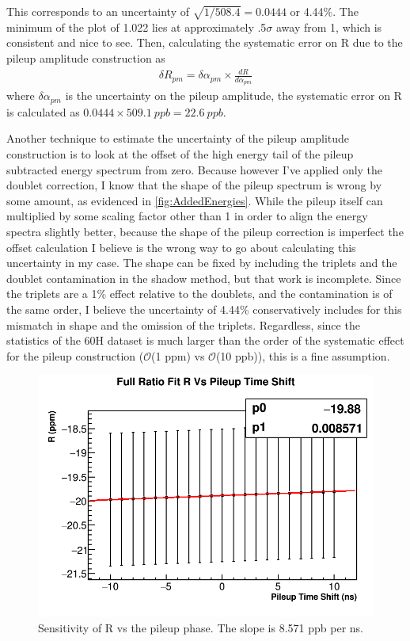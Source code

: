 	This corresponds to an uncertainty of $\sqrt{1/508.4} = 0.0444$ or 4.44\%. The minimum of the \chisq plot of 1.022 lies at approximately .5$\sigma$ away from 1, which is consistent and nice to see. Then, calculating the systematic error on R due to the pileup amplitude construction as 
		\begin{align}
			\delta R_{pm} = \delta\alpha_{pm} \times \frac{dR}{d\alpha_{pm}}
		\end{align}
	where $\delta\alpha_{pm}$ is the uncertainty on the pileup amplitude, the systematic error on R is calculated as $0.0444 \times \SI{509.1}{ppb} = \SI{22.6}{ppb}$.

	Another technique to estimate the uncertainty of the pileup amplitude construction is to look at the offset of the high energy tail of the pileup subtracted energy spectrum from zero. Because however I've applied only the doublet correction, I know that the shape of the pileup spectrum is wrong by some amount, as evidenced in \ref{fig:AddedEnergies}. While the pileup itself can multiplied by some scaling factor other than 1 in order to align the energy spectra slightly better, because the shape of the pileup correction is imperfect the offset calculation I believe is the wrong way to go about calculating this uncertainty in my case. The shape can be fixed by including the triplets and the doublet contamination in the shadow method, but that work is incomplete. Since the triplets are a 1\% effect relative to the doublets, and the contamination is of the same order, I believe the uncertainty of 4.44\% conservatively includes for this mismatch in shape and the omission of the triplets. Regardless, since the statistics of the 60H dataset is much larger than the order of the systematic effect for the pileup construction ($\mathcal{O}$(1 ppm) vs $\mathcal{O}$(10 ppb)), this is a fine assumption.

	\begin{figure}[h]
		\centering
		\includegraphics[width=.5\textwidth]{RatioCBO_R_Vs_PileupTimeShift_Canv}
	    \caption[PileupPhase]{Sensitivity of R vs the pileup phase. The slope is 8.571 ppb per ns.}
	    \label{fig:PileupPhase}
	\end{figure}

